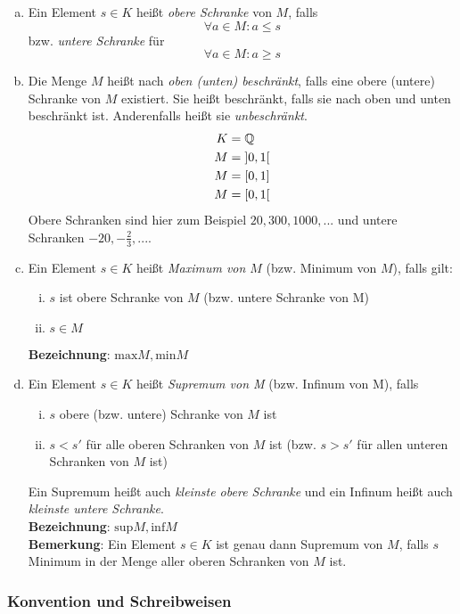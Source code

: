 \documentclass{article}
\begin{document}
\begin{enumerate}[(a)]
\item Ein Element $s \in K$ heißt \emph{obere Schranke} von $M$, falls
  \[
    \forall a \in M \colon a \leq s
  \]
  bzw. \emph{untere Schranke} für
  \[
    \forall a \in M \colon a \geq s
  \]
\item Die Menge $M$ heißt nach \emph{oben (unten) beschränkt}, falls eine obere (untere) Schranke von $M$ existiert.
  Sie heißt beschränkt, falls sie nach oben und unten beschränkt ist. Anderenfalls heißt sie \emph{unbeschränkt}.
  \begin{align*}
    K &= \mathbb{Q} \\
    M &= \interval[open]{0}{1} \\
    M &= \interval{0}{1} \\
    M &= \interval[open right]{0}{1} \\
  \end{align*}
  Obere Schranken sind hier zum Beispiel $20, 300, 1000, ...$ und untere Schranken $-20, -\frac{2}{3}, ...$.
\item Ein Element $s \in K$ heißt \emph{Maximum von $M$} (bzw. Minimum von $M$), falls gilt:
  \begin{enumerate}[i)]
  \item $s$ ist obere Schranke von $M$ (bzw. untere Schranke von M)
  \item $s \in M$
  \end{enumerate}
  \textbf{Bezeichnung}: $\text{max}M, \text{min}M$
\item Ein Element $s \in K$ heißt \emph{Supremum von M} (bzw. Infinum von M), falls
  \begin{enumerate}[i)]
  \item $s$ obere (bzw. untere) Schranke von $M$ ist
  \item \label{sec:1.3.1_d_ii} $s < s'$ für alle oberen Schranken von $M$ ist (bzw. $s > s'$ für allen unteren Schranken von $M$ ist)
  \end{enumerate}
  Ein Supremum heißt auch \emph{kleinste obere Schranke} und ein Infinum heißt auch \emph{kleinste untere Schranke}.\\
  \textbf{Bezeichnung}: $\text{sup}M, \text{inf}M$ \\
  \textbf{Bemerkung}: Ein Element $s \in K$ ist genau dann Supremum von $M$, falls $s$ Minimum in der Menge aller oberen Schranken von $M$ ist.
\end{enumerate}

\subsubsection{Konvention und Schreibweisen}
\end{document}

